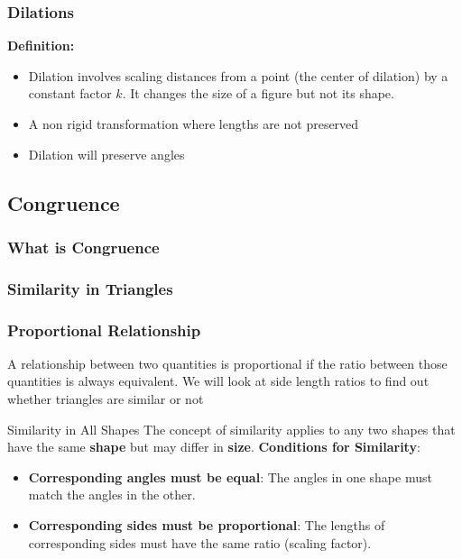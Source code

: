 \documentclass{beamer}
\begin{document}
  \begin{frame}
    \frametitle{Dilations}
    \textbf{Definition:}
        \begin{itemize}
            \item Dilation involves scaling distances from a point (the center of dilation) by a constant factor $k$. It changes the size of a figure but not its shape.
        \end{itemize}
    \begin{itemize}
        \item A non rigid transformation where lengths are not preserved 
        \item Dilation will preserve angles 
    \end{itemize}
    
    \subsection{Congruence}
    \begin{frame}
        \frametitle{What is Congruence}
    
        
    
    \end{frame}
  
  \end{frame}
    

\begin{frame}
    \frametitle{Similarity in Triangles}
\end{frame}



\begin{frame}
    \frametitle{Proportional Relationship}
    A relationship between two quantities is proportional if the ratio between those quantities is always equivalent. We will look at side length ratios to find out whether triangles are similar or not
\end{frame}

\begin{frame}{Similarity in All Shapes}
  The concept of similarity applies to any two shapes that have the same \textbf{shape} but may differ in \textbf{size}.
    \vspace{10pt}
    \textbf{Conditions for Similarity}:
    \begin{itemize}
        \item \textbf{Corresponding angles must be equal}: The angles in one shape must match the angles in the other.
        \item \textbf{Corresponding sides must be proportional}: The lengths of corresponding sides must have the same ratio (scaling factor).
    \end{itemize}
\end{frame}
\end{document}
